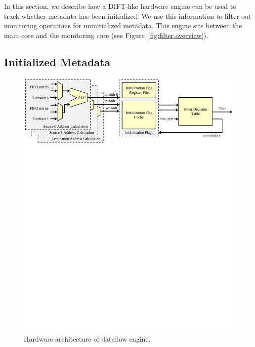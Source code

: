 In this section, we describe how a DIFT-like hardware engine can be used to track
whether metadata has been initialized. We use this information to filter out
monitoring operations for uninitialized metadata. This engine sits between the
main core and the monitoring core (see Figure~\ref{fig:filter.overview}).

\subsection{Initialized Metadata}

\begin{figure}
  \begin{center}
    \includegraphics[width=\linewidth]{figs/dataflow_architecture.pdf}
    \vspace{-0.3in}
    \caption{Hardware architecture of dataflow engine.}
    \label{fig:filter.architecture} 
    \vspace{-0.1in}
  \end{center}
\end{figure}

